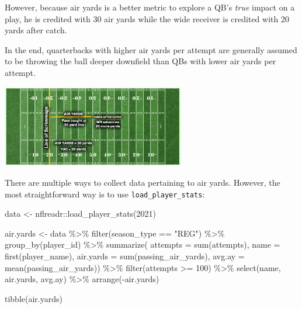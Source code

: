 \documentclass[
  letterpaper,
]{krantz}
\newenvironment{Shaded}{\begin{snugshade}}{\end{snugshade}}
\newcommand{\AttributeTok}[1]{\textcolor[rgb]{0.40,0.45,0.13}{#1}}
\newcommand{\DecValTok}[1]{\textcolor[rgb]{0.68,0.00,0.00}{#1}}
\newcommand{\FunctionTok}[1]{\textcolor[rgb]{0.28,0.35,0.67}{#1}}
\newcommand{\NormalTok}[1]{\textcolor[rgb]{0.00,0.23,0.31}{#1}}
\newcommand{\OtherTok}[1]{\textcolor[rgb]{0.00,0.23,0.31}{#1}}
\newcommand{\SpecialCharTok}[1]{\textcolor[rgb]{0.37,0.37,0.37}{#1}}
\newcommand{\StringTok}[1]{\textcolor[rgb]{0.13,0.47,0.30}{#1}}
\begin{document}
However, because air yards is a better metric to explore a QB's
\emph{true} impact on a play, he is credited with 30 air yards while the
wide receiver is credited with 20 yards after catch.

In the end, quarterbacks with higher air yards per attempt are generally
assumed to be throwing the ball deeper downfield than QBs with lower air
yards per attempt.

\includegraphics[width=3.15in,height=\textheight]{./images/airyards_101.png}

There are multiple ways to collect data pertaining to air yards.
However, the most straightforward way is to use
\texttt{load\_player\_stats}:

\begin{Shaded}
\begin{Highlighting}[]
\NormalTok{data }\OtherTok{\textless{}{-}}\NormalTok{ nflreadr}\SpecialCharTok{::}\FunctionTok{load\_player\_stats}\NormalTok{(}\DecValTok{2021}\NormalTok{)}

\NormalTok{air.yards }\OtherTok{\textless{}{-}}\NormalTok{ data }\SpecialCharTok{\%\textgreater{}\%}
  \FunctionTok{filter}\NormalTok{(season\_type }\SpecialCharTok{==} \StringTok{"REG"}\NormalTok{) }\SpecialCharTok{\%\textgreater{}\%}
  \FunctionTok{group\_by}\NormalTok{(player\_id) }\SpecialCharTok{\%\textgreater{}\%}
  \FunctionTok{summarize}\NormalTok{(}
    \AttributeTok{attempts =} \FunctionTok{sum}\NormalTok{(attempts),}
    \AttributeTok{name =} \FunctionTok{first}\NormalTok{(player\_name),}
    \AttributeTok{air.yards =} \FunctionTok{sum}\NormalTok{(passing\_air\_yards),}
    \AttributeTok{avg.ay =} \FunctionTok{mean}\NormalTok{(passing\_air\_yards)) }\SpecialCharTok{\%\textgreater{}\%}
  \FunctionTok{filter}\NormalTok{(attempts }\SpecialCharTok{\textgreater{}=} \DecValTok{100}\NormalTok{) }\SpecialCharTok{\%\textgreater{}\%}
  \FunctionTok{select}\NormalTok{(name, air.yards, avg.ay) }\SpecialCharTok{\%\textgreater{}\%}
  \FunctionTok{arrange}\NormalTok{(}\SpecialCharTok{{-}}\NormalTok{air.yards)}

\FunctionTok{tibble}\NormalTok{(air.yards)}
\end{Highlighting}
\end{Shaded}
\end{document}
